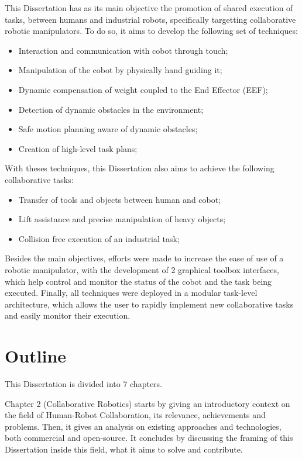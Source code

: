 \par This Dissertation has as its main objective the promotion of shared execution of tasks, between humans and industrial robots, specifically targetting collaborative robotic manipulators. To do so, it aims to develop the following set of techniques:

\begin{itemize}
    \item Interaction and communication with cobot through touch;
    \item Manipulation of the cobot by physically hand guiding it;
    \item Dynamic compensation of weight coupled to the End Effector (EEF);
    \item Detection of dynamic obstacles in the environment;
    \item Safe motion planning aware of dynamic obstacles;
    \item Creation of high-level task plans;
\end{itemize}

\par With theses techniques, this Dissertation also aims to achieve the following collaborative tasks:

\begin{itemize}
    \item Transfer of tools and objects between human and cobot;
    \item Lift assistance and precise manipulation of heavy objects;
    \item Collision free execution of an industrial task;
\end{itemize}

\par Besides the main objectives, efforts were made to increase the ease of use of a robotic manipulator, with the development of 2 graphical toolbox interfaces, which help control and monitor the status of the cobot and the task being executed. Finally, all techniques were deployed in a modular task-level architecture, which allows the user to rapidly implement new collaborative tasks and easily monitor their execution.


\section{Outline}

\par This Dissertation is divided into 7 chapters.
\par Chapter 2 (Collaborative Robotics) starts by giving an introductory context on the field of Human-Robot Collaboration, its relevance, achievements and problems. Then, it gives an analysis on existing approaches and technologies, both commercial and open-source. It concludes by discussing the framing of this Dissertation inside this field, what it aims to solve and contribute.

